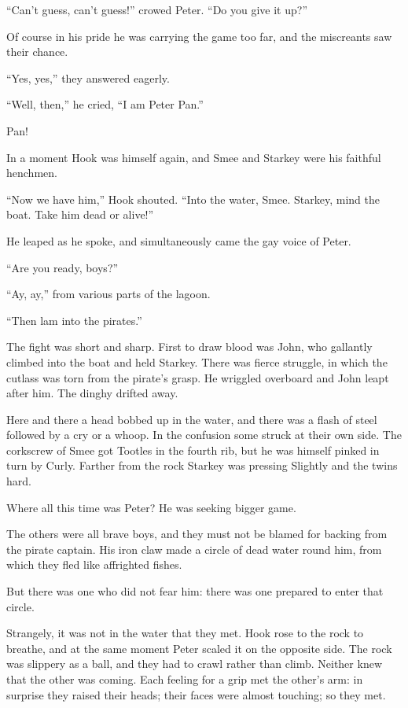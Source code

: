 “Can’t guess, can’t guess!\@” crowed Peter.
“Do you give it up?”

Of course in his pride he was carrying the game too far, and the miscreants saw their chance.

“Yes, yes,” they answered eagerly.

“Well, then,” he cried, “I am Peter Pan.”

Pan!

In a moment Hook was himself again, and Smee and Starkey were his faithful henchmen.

“Now we have him,” Hook shouted.
“Into the water, Smee.
Starkey, mind the boat.
Take him dead or alive!”

He leaped as he spoke, and simultaneously came the gay voice of Peter.

“Are you ready, boys?”

“Ay, ay,” from various parts of the lagoon.

“Then lam into the pirates.”

The fight was short and sharp.
First to draw blood was John, who gallantly climbed into the boat and held Starkey.
There was fierce struggle, in which the cutlass was torn from the pirate’s grasp.
He wriggled overboard and John leapt after him.
The dinghy drifted away.

Here and there a head bobbed up in the water, and there was a flash of steel followed by a cry or a whoop.
In the confusion some struck at their own side.
The corkscrew of Smee got Tootles in the fourth rib, but he was himself pinked in turn by Curly.
Farther from the rock Starkey was pressing Slightly and the twins hard.

Where all this time was Peter?
He was seeking bigger game.

The others were all brave boys, and they must not be blamed for backing from the pirate captain.
His iron claw made a circle of dead water round him, from which they fled like affrighted fishes.

But there was one who did not fear him:
there was one prepared to enter that circle.

Strangely, it was not in the water that they met.
Hook rose to the rock to breathe, and at the same moment Peter scaled it on the opposite side.
The rock was slippery as a ball, and they had to crawl rather than climb.
Neither knew that the other was coming.
Each feeling for a grip met the other’s arm:
in surprise they raised their heads;
their faces were almost touching;
so they met.

